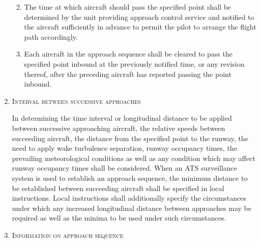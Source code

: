 \documentclass[../main.tex]{subfiles}
\begin{document}
\begin{enumeratesc}
\begin{enumerate}[labelindent=0pt,itemsep=0.2cm]
\begin{enumerate}

                \item The time at which aircraft should pass the specified point shall be determined by the unit providing approach control service and notified to the aircraft sufficiently in advance to permit the pilot to arrange the flight path accordingly.
                \item Each aircraft in the approach sequence shall be cleared to pass the specified point inbound at the previously notified time, or any revision thereof, after the preceding aircraft has reported passing the point inbound.
            \end{enumerate}

            \item \textsc{Interval between successive approaches}

            \noindent In determining the time interval or longitudinal distance to be applied between successive approaching aircraft, the relative speeds between succeeding aircraft, the distance from the specified point to the runway, the need to apply wake turbulence separation, runway occupancy times, the prevailing meteorological conditions as well as any condition which may affect runway occupancy times shall be considered. When an ATS surveillance system is used to establish an approach sequence, the minimum distance to be established between succeeding aircraft shall be specified in local instructions. Local instructions shall additionally specify the circumstances under which any increased longitudinal distance between approaches may be required as well as the minima to be used under such circumstances.

            \item \textsc{Information on approach sequence}


\end{enumerate}
\end{enumeratesc}
\end{document}
